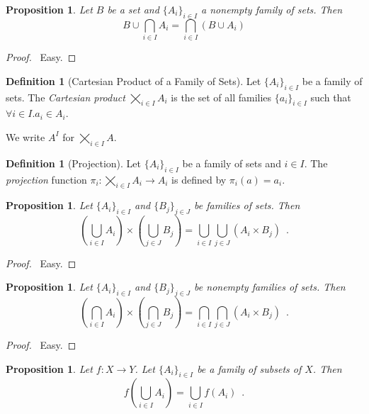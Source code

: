 \documentclass{report}
\let\qed\relax
\newtheorem{prop}[ax]{Proposition}
\theoremstyle{definition}
\newtheorem{df}[ax]{Definition}
\begin{document}
\begin{prop}
Let $B$ be a set and $\{A_i\}_{i \in I}$ a nonempty family of sets. Then
\[ B \cup \bigcap_{i \in I} A_i = \bigcap_{i \in I}
 (B \cup A_i) \]
\end{prop}

\begin{proof}
\pf\ Easy. \qed
\end{proof}

\begin{df}[Cartesian Product of a Family of Sets]
Let $\{A_i\}_{i \in I}$ be a family of sets. The \emph{Cartesian product} $\bigtimes_{i \in I} A_i$ is the set of all families $\{a_i\}_{i \in I}$ such that $\forall i \in I. a_i \in A_i$.

We write $A^I$ for $\bigtimes_{i \in I} A$.
\end{df}

\begin{df}[Projection]
Let $\{A_i\}_{i \in I}$ be a family of sets and $i \in I$. The \emph{projection} function $\pi_i : \bigtimes_{i \in I} A_i \rightarrow A_i$ is defined by $\pi_i(a) = a_i$.
\end{df}

\begin{prop}
Let $\{A_i\}_{i \in I}$ and $\{B_j\}_{j \in J}$ be families of sets. Then
\[ \left( \bigcup_{i \in I} A_i \right) \times \left( \bigcup_{j \in J} B_j \right) = \bigcup_{i \in I} \bigcup_{j \in J} (A_i \times B_j) \enspace . \]
\end{prop}

\begin{proof}
\pf\ Easy. \qed
\end{proof}

\begin{prop}
Let $\{A_i\}_{i \in I}$ and $\{B_j\}_{j \in J}$ be nonempty families of sets. Then
\[ \left( \bigcap_{i \in I} A_i \right) \times \left( \bigcap_{j \in J} B_j \right) = \bigcap_{i \in I} \bigcap_{j \in J} (A_i \times B_j) \enspace . \]
\end{prop}

\begin{proof}
\pf\ Easy. \qed
\end{proof}

\begin{prop}
Let $f : X \rightarrow Y$. Let $\{A_i\}_{i \in I}$ be a family of subsets of $X$. Then
\[ f \left( \bigcup_{i \in I} A_i \right) = \bigcup_{i \in I} f(A_i) \enspace . \]
\end{prop}
\end{document}
